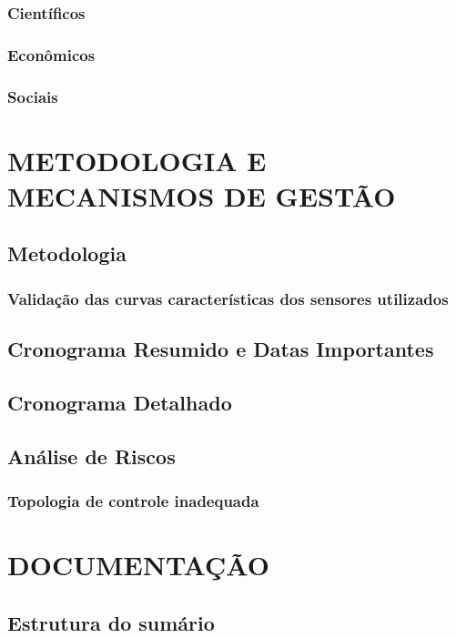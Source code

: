 \documentclass[a4paper]{article}
\begin{document}
\subsubsection{Científicos}

\subsubsection{Econômicos}

\subsubsection{Sociais}

\section{METODOLOGIA E MECANISMOS DE GESTÃO}

\subsection{Metodologia}

\subsubsection{Validação das curvas características dos sensores utilizados}

\subsection{Cronograma Resumido e Datas Importantes}

\subsection{Cronograma Detalhado}

\subsection{Análise de Riscos}

\subsubsection{Topologia de controle inadequada}

\section{DOCUMENTAÇÃO}

\subsection{Estrutura do sumário}

\nocite {Knuth92,ConcreteMath,Simpson,Er01}



\end{document}
